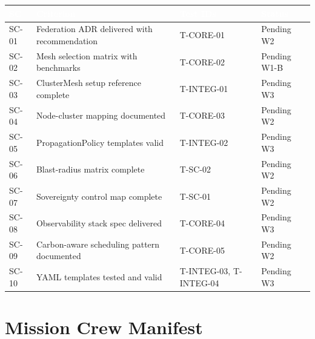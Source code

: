 \documentclass[11pt,letterpaper]{article}
\newcommand{\tableheader}[1]{\textbf{\sffamily\textcolor{white}{#1}}}
\begin{document}
\begin{center}
\begin{tabularx}{\textwidth}{C{1cm}L{4.5cm}L{3cm}C{2cm}}
\toprule
{}
\tableheader{SC} & \tableheader{Criterion} & \tableheader{Test IDs} & \tableheader{Status} \\
\midrule
SC-01 & Federation ADR delivered with recommendation & T-CORE-01 & \textcolor{secondary}{Pending W2} \\
SC-02 & Mesh selection matrix with benchmarks & T-CORE-02 & \textcolor{secondary}{Pending W1-B} \\
SC-03 & ClusterMesh setup reference complete & T-INTEG-01 & \textcolor{secondary}{Pending W3} \\
SC-04 & Node-cluster mapping documented & T-CORE-03 & \textcolor{secondary}{Pending W2} \\
SC-05 & PropagationPolicy templates valid & T-INTEG-02 & \textcolor{secondary}{Pending W3} \\
SC-06 & Blast-radius matrix complete & T-SC-02 & \textcolor{secondary}{Pending W2} \\
SC-07 & Sovereignty control map complete & T-SC-01 & \textcolor{secondary}{Pending W2} \\
SC-08 & Observability stack spec delivered & T-CORE-04 & \textcolor{secondary}{Pending W3} \\
SC-09 & Carbon-aware scheduling pattern documented & T-CORE-05 & \textcolor{secondary}{Pending W2} \\
SC-10 & YAML templates tested and valid & T-INTEG-03, T-INTEG-04 & \textcolor{secondary}{Pending W3} \\
\bottomrule
\end{tabularx}
\end{center}

\section{Mission Crew Manifest}
\end{document}
